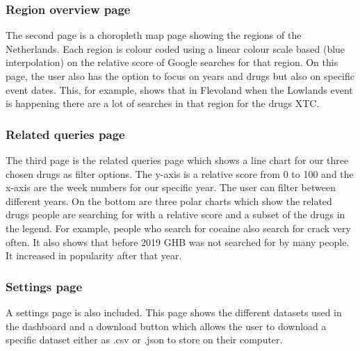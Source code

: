 \subsubsection{Region overview page}
The second page is a choropleth map page showing the regions of the Netherlands. Each region is colour coded using a linear colour scale based (blue interpolation) on the relative score of Google searches for that region. On this page, the user also has the option to focus on years and drugs but also on specific event dates. This, for example, shows that in Flevoland when the Lowlands event is happening there are a lot of searches in that region for the drugs XTC.

\subsubsection{Related queries page}
The third page is the related queries page which shows a line chart for our three chosen drugs as filter options. The y-axis is a relative score from 0 to 100 and the x-axis are the week numbers for our specific year. The user can filter between different years. On the bottom are three polar charts which show the related drugs people are searching for with a relative score and a subset of the drugs in the legend. For example, people who search for cocaine also search for crack very often. It also shows that before 2019 GHB was not searched for by many people. It increased in popularity after that year.

\subsubsection{Settings page}
A settings page is also included. This page shows the different datasets used in the dashboard and a download button which allows the user to download a specific dataset either as .csv or .json to store on their computer.


